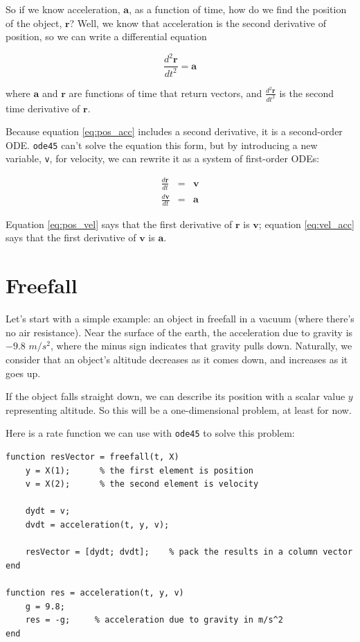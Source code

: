 \documentclass[
]{book}
\renewcommand{\vec}[1]{\bm{\mathbf{#1}}}
\begin{document}
So if we know acceleration, $\vec{a}$, as a function of time, how do we
find the position of the object, $\vec{r}$?  Well, we know that acceleration
is the second derivative of position, so we can write a differential
equation

\begin{equation}\label{eq:pos_acc}
    \frac{d^2\vec{r}}{dt^2} = \vec{a}
\end{equation}

where $\vec{a}$ and $\vec{r}$ are functions of time that return vectors,
and $\frac{d^2\vec{r}}{dt^2}$ is the second time derivative of $\vec{r}$.

Because equation \eqref{eq:pos_acc} includes a second derivative, it is
a second-order ODE.  {\tt ode45} can't solve the equation this form, but
by introducing a new variable, {\tt v}, for velocity, we can rewrite it
as a system of first-order ODEs:

\begin{eqnarray}
    \label{eq:pos_vel}
    \frac{d\vec{r}}{dt} &=& \vec{v}     \\[6pt]
    \label{eq:vel_acc}
    \frac{d\vec{v}}{dt} &=& \vec{a}
\end{eqnarray}

Equation \eqref{eq:pos_vel} says that the first derivative of $\vec{r}$ is $\vec{v}$;
equation \eqref{eq:vel_acc} says that the first derivative of $\vec{v}$ is $\vec{a}$.


\section{Freefall}
\label{sect:freefall}

Let's start with a simple example: an object in freefall in a vacuum
(where there's no air resistance).  Near the surface of the earth, the
acceleration due to gravity is $-9.8$ $m/s^2$, where the minus sign
indicates that gravity pulls down.  Naturally, we consider that an 
object's altitude decreases as it comes down, and increases as it goes up.

If the object falls straight down, we can describe its position with a
scalar value $y$ representing altitude.  So this will be a
one-dimensional problem, at least for now.

Here is a rate function we can use with {\tt ode45} to solve
this problem:

\begin{verbatim}
function resVector = freefall(t, X)
    y = X(1);      % the first element is position
    v = X(2);      % the second element is velocity

    dydt = v;
    dvdt = acceleration(t, y, v);

    resVector = [dydt; dvdt];    % pack the results in a column vector
end

function res = acceleration(t, y, v)
    g = 9.8;     
    res = -g;     % acceleration due to gravity in m/s^2
end
\end{verbatim}
\end{document}
